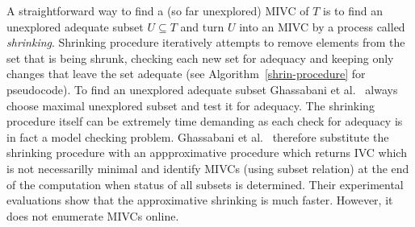 A straightforward way to find a (so far unexplored) MIVC of $T$ is to find an unexplored adequate subset $U \subseteq T$ and turn $U$  into an MIVC by a process called \emph{shrinking}. Shrinking procedure iteratively attempts to remove elements from the set that is being shrunk, checking each new set for adequacy and keeping only changes that
leave the set adequate (see Algorithm~\ref{shrin-procedure} for pseudocode). To find an unexplored adequate subset Ghassabani et al.~\cite{Ghass17AllIVCs}  always choose maximal unexplored subset and test it for adequacy.
The shrinking procedure itself can be   extremely time demanding  as  each check for adequacy is in fact a  model checking problem.  Ghassabani et al.~\cite{}  therefore substitute the shrinking procedure  with an appproximative procedure which returns  IVC which is not necessarilly minimal and identify  MIVCs (using subset relation) at the end of the computation when status of all subsets is determined. Their experimental evaluations show that the approximative shrinking is much faster. However,  it does not enumerate MIVCs online.


%
%
%


